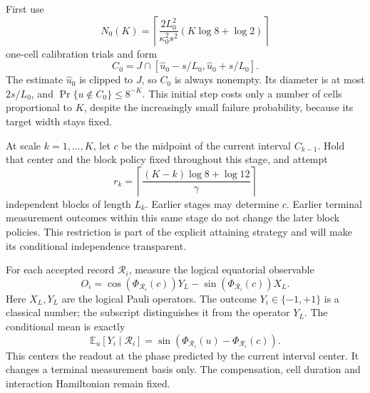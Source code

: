 \documentclass[11pt,a4paper]{article}
\numberwithin{equation}{section}
\theoremstyle{remark}
\begin{document}
First use
\begin{equation}
 N_0(K)=\left\lceil
 \frac{2L_0^2}{\kappa_0^2s^2}
       (K\log 8+\log 2)\right\rceil
 \label{phase:calibrationcost}
\end{equation}
one-cell calibration trials and form
\begin{equation}
 C_0=J\cap[\widehat u_0-s/L_0,\widehat u_0+s/L_0].
 \label{phase:initialinterval}
\end{equation}
The estimate $\widehat u_0$ is clipped to $J$, so $C_0$ is always nonempty.
Its diameter is at most $2s/L_0$, and
$\Pr\{u\notin C_0\}\le8^{-K}$.  This initial step costs only a number of
cells proportional to $K$, despite the increasingly small failure
probability, because its target width stays fixed.

At scale $k=1,\ldots,K$, let $c$ be the midpoint of the current interval
$C_{k-1}$.  Hold that center and the block policy fixed throughout this
stage, and attempt
\begin{equation}
 r_k=\left\lceil
 \frac{(K-k)\log8+\log12}{\gamma}
 \right\rceil
 \label{phase:repetitioncounts}
\end{equation}
independent blocks of length $L_k$.  Earlier stages may determine $c$.
Earlier terminal measurement outcomes within this same stage do not change
the later block policies.  This restriction is part of the explicit
attaining strategy and will make its conditional independence transparent.

For each accepted record $\mathcal R_i$, measure the logical equatorial
observable
\begin{equation}
 O_i=\cos(\Phi_{\mathcal R_i}(c))Y_L
       -\sin(\Phi_{\mathcal R_i}(c))X_L.
 \label{phase:observable}
\end{equation}
Here $X_L,Y_L$ are the logical Pauli operators.  The outcome
$Y_i\in\{-1,+1\}$ is a classical number; the subscript distinguishes it from
the operator $Y_L$.  The conditional mean is exactly
\begin{equation}
 \mathbb E_u[Y_i\mid\mathcal R_i]
 =\sin(\Phi_{\mathcal R_i}(u)-\Phi_{\mathcal R_i}(c)).
 \label{phase:meanreadout}
\end{equation}
This centers the readout at the phase predicted by the current interval
center.  It changes a terminal measurement basis only.  The compensation,
cell duration and interaction Hamiltonian remain fixed.
\end{document}
